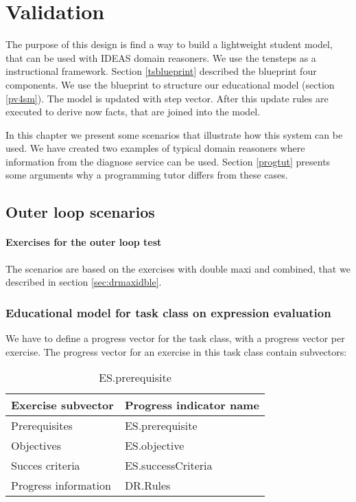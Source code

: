 \chapter{Validation}
\label{ch:valid}
The purpose of this design is find a way to build a lightweight student model, that can be used with IDEAS domain reasoners.
We use the \gls{tensteps} as a instructional framework.
Section \ref{tsblueprint} described the blueprint four components.
We use the blueprint to structure our educational model  (section \ref{pv4sm}).
The model is updated with  step vector. 
After this update  rules are executed to derive now facts, that are joined into the model.

In this chapter we present some scenarios that illustrate how this system can be used.
We have created two examples of typical domain reasoners where information from the diagnose service can be used.
Section \ref{progtut} presents some arguments why a programming tutor differs from these cases.

\section{Outer loop scenarios}


\subsubsection{Exercises for the outer loop test}

The scenarios are based on the exercises with double maxi and combined, that we described in section \ref{sec:drmaxidble}.

\subsection{Educational model for task class on expression evaluation}

We have to define a progress vector for the task class, with a progress vector per exercise.
The progress vector for an exercise in this task class contain subvectors:

\begin{table}[H]
\begin{tabular}{| l | l |}
\hline
Exercise subvector & Progress indicator name\\
\hline
Prerequisites& ES.prerequisite\\
Objectives& ES.objective\\
Succes criteria& ES.successCriteria\\
Progress information& DR.Rules\\
\hline
\end{tabular}
\caption{ES.prerequisite}
\label{double.obj}
\end{table}

